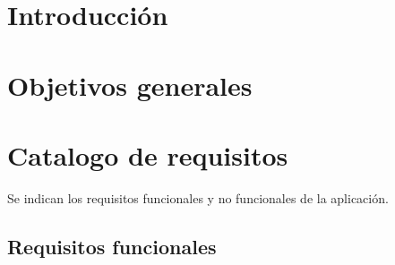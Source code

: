 
\section{Introducción}

\section{Objetivos generales}

\section{Catalogo de requisitos}

Se indican los requisitos funcionales y no funcionales de la aplicación.

\subsection{Requisitos funcionales}
 
